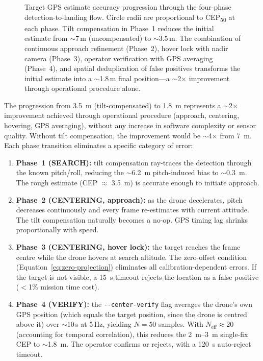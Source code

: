 \begin{figure}[H]
\begin{tikzpicture}
\end{tikzpicture}
\caption{Target GPS estimate accuracy progression through the four-phase detection-to-landing flow.  Circle radii are proportional to CEP\textsubscript{50} at each phase.  Tilt compensation in Phase~1 reduces the initial estimate from $\sim$7\,m (uncompensated) to $\sim$3.5\,m.  The combination of continuous approach refinement (Phase~2), hover lock with nadir camera (Phase~3), operator verification with GPS averaging (Phase~4), and spatial deduplication of false positives transforms the initial estimate into a $\sim$1.8\,m final position---a $\sim$2$\times$ improvement through operational procedure alone.}
\label{fig:accuracy-progression}
\end{figure}

\noindent The progression from \SI{3.5}{\metre} (tilt-compensated) to \SI{1.8}{\metre} represents a $\sim$2$\times$ improvement achieved through operational procedure (approach, centering, hovering, GPS averaging), without any increase in software complexity or sensor quality.  Without tilt compensation, the improvement would be $\sim$4$\times$ from \SI{7}{\metre}.  Each phase transition eliminates a specific category of error:

\begin{enumerate}
  \item \textbf{Phase~1 (SEARCH):} tilt compensation ray-traces the detection through the known pitch/roll, reducing the $\sim$\SI{6.2}{\metre} pitch-induced bias to $\sim$\SI{0.3}{\metre}.  The rough estimate (CEP $\approx$ \SI{3.5}{\metre}) is accurate enough to initiate approach.
  \item \textbf{Phase~2 (CENTERING, approach):} as the drone decelerates, pitch decreases continuously and every frame re-estimates with current attitude.  The tilt compensation naturally becomes a no-op.  GPS timing lag shrinks proportionally with speed.
  \item \textbf{Phase~3 (CENTERING, hover lock):} the target reaches the frame centre while the drone hovers at search altitude.  The zero-offset condition (Equation~\ref{eq:zero-projection}) eliminates all calibration-dependent errors.  If the target is not visible, a \SI{15}{\second} timeout rejects the location as a false positive ($<$1\% mission time cost).
  \item \textbf{Phase~4 (VERIFY):} the \texttt{-{}-center-verify} flag averages the drone's own GPS position (which equals the target position, since the drone is centred above it) over $\sim$10\,s at 5\,Hz, yielding $N = 50$ samples.  With $N_\mathrm{eff} \approx 20$ (accounting for temporal correlation), this reduces the \SIrange{2}{3}{\metre} single-fix CEP to $\sim$\SI{1.8}{\metre}.  The operator confirms or rejects, with a \SI{120}{\second} auto-reject timeout.
\end{enumerate}

